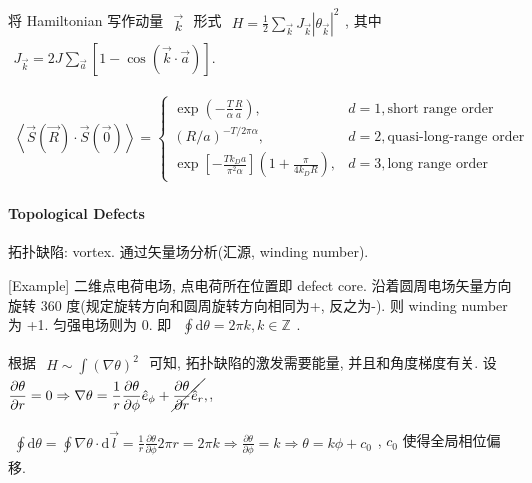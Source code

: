\documentclass[../../main.tex]{subfiles}
\begin{document}
将 Hamiltonian 写作动量 $\begin{aligned}
    \vec{k}
\end{aligned}$ 形式 $\begin{aligned}
    H = \frac{1}{2}\sum_{\vec{k}}J_{\vec{k}}|\theta_{\vec{k}}|^{2}
\end{aligned}$, 其中 $\begin{aligned}
    J_{\vec{k}} = 2J\sum_{\vec{a}}\left[
        1-\cos{\left(\vec{k}\cdot\vec{a}\right)}
    \right]. 
\end{aligned}$

$\begin{aligned}
    \left\langle \vec{S}\left(\vec{R}\right)\cdot\vec{S}\left(\vec{0}\right)\right\rangle = \begin{cases}
        \exp{\left(-\frac{T}{\alpha}\frac{R}{a}\right)},&d=1,\text{short range order}\\
        \left(R/a\right)^{-T/2\pi\alpha},&d=2,\text{quasi-long-range order}\\
        \exp{\left[-\frac{Tk_{D}a}{\pi^{2}\alpha}\right]}\left(1 + \frac{\pi}{4k_{D}R}\right),&d=3, \text{long range order}
    \end{cases}
\end{aligned}$

\paragraph{Topological Defects}
拓扑缺陷: vortex. 通过矢量场分析(汇源, winding number).

[Example] 二维点电荷电场, 点电荷所在位置即 defect core. 沿着圆周电场矢量方向旋转 360 度(规定旋转方向和圆周旋转方向相同为+, 反之为-). 则 winding number 为 +1. 匀强电场则为 0. 即 $\begin{aligned}
    \oint\mathrm{d}\theta = 2\pi k, k\in\mathbb{Z}
\end{aligned}$. 

根据 $\begin{aligned}
    H\sim \int(\nabla\theta)^{2}
\end{aligned}$ 可知, 拓扑缺陷的激发需要能量, 并且和角度梯度有关. 设 $\begin{aligned}
    \frac{\partial\theta}{\partial r} = 0\Rightarrow\nabla\theta = \frac{1}{r}\frac{\partial\theta}{\partial\phi}\hat{e}_{\phi} + \cancel{\frac{\partial\theta}{\partial r}\hat{e}_{r}},
\end{aligned}$,

$\begin{aligned}\oint\mathrm{d}\theta = \oint\nabla\theta\cdot \mathrm{d}\vec{l} = \frac{1}{r}\frac{\partial\theta}{\partial\phi}2\pi r = 2\pi k\Rightarrow \frac{\partial\theta}{\partial\phi} = k\Rightarrow \theta = k\phi + c_{0}
\end{aligned}$, $c_{0}$ 使得全局相位偏移. 
\end{document}
